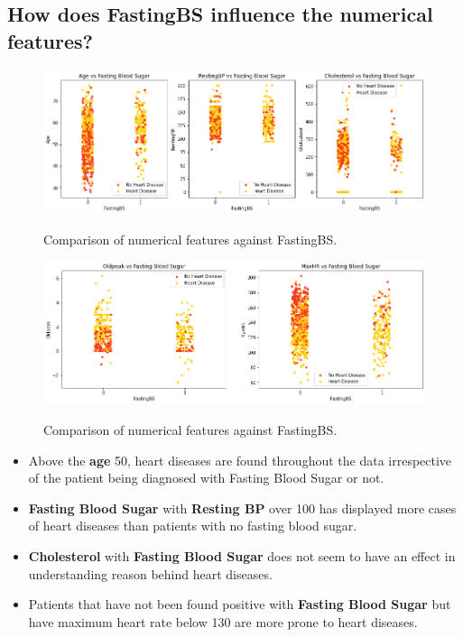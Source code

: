 \subsection{How does FastingBS influence the numerical features?}
\begin{figure}[!htpb]
    \centering
    \includegraphics[width=0.7\linewidth]{Figures/Outputs/fasting-num.png}
    \label{Comparison between numerical features against FastingBS}
    \caption{Comparison of numerical features against FastingBS.}
\end{figure}
\begin{figure}[!htpb]
    \centering
    \includegraphics[width=0.7\linewidth]{Figures/Outputs/fasting-num2.png}
    \label{Comparison between numerical features against FastingBS.}
    \caption{Comparison of numerical features against FastingBS.}
\end{figure}
\begin{itemize}
    \item Above the \textbf{age} 50, heart diseases are found throughout the data irrespective of the patient being diagnosed with Fasting Blood Sugar or not.
    \item \textbf{Fasting Blood Sugar} with \textbf{Resting BP} over 100 has displayed more cases of heart diseases than patients with no fasting blood sugar.
    \item \textbf{Cholesterol} with \textbf{Fasting Blood Sugar} does not seem to have an effect in understanding reason behind heart diseases.
    \item Patients that have not been found positive with \textbf{Fasting Blood Sugar} but have maximum heart rate below 130 are more prone to heart diseases.
\end{itemize}

